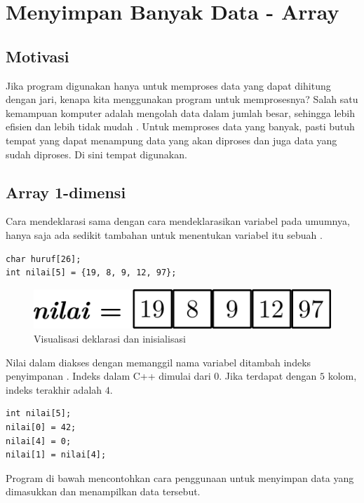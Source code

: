 \documentclass[../main.tex]{subfiles}
\begin{document}
\chapter{Menyimpan Banyak Data - Array}
\section{Motivasi}
Jika program digunakan hanya untuk memproses data yang dapat dihitung dengan
jari, kenapa kita menggunakan program untuk memprosesnya? Salah satu kemampuan
komputer adalah mengolah data dalam jumlah besar, sehingga lebih efisien dan
lebih tidak mudah . Untuk memproses data yang banyak, pasti butuh
tempat yang dapat menampung data yang akan diproses dan juga data yang sudah
diproses. Di sini tempat  digunakan.

\section{Array 1-dimensi}
Cara mendeklarasi  sama dengan cara mendeklarasikan variabel pada
umumnya, hanya saja ada sedikit tambahan  untuk menentukan variabel
itu sebuah .

\begin{verbatim}
char huruf[26];
int nilai[5] = {19, 8, 9, 12, 97};
\end{verbatim}

\begin{figure}[h]
\centering
\includegraphics[scale=0.5]{img/array_1_dec_init}
\caption{Visualisasi deklarasi dan inisialisasi }
\label{arr:decinit}
\end{figure}

Nilai dalam  diakses dengan memanggil nama variabel ditambah indeks
penyimpanan . Indeks  dalam C++ dimulai dari \(0\). Jika
terdapat  dengan \(5\) kolom, indeks terakhir adalah \(4\).

\begin{verbatim}
int nilai[5];
nilai[0] = 42;
nilai[4] = 0;
nilai[1] = nilai[4];
\end{verbatim}

Program di bawah mencontohkan cara penggunaan  untuk menyimpan data
yang dimasukkan dan menampilkan data tersebut.
\end{document}
